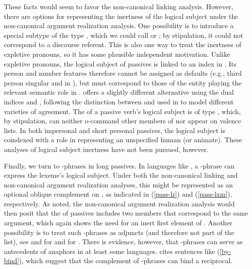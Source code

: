 \documentclass[output=paper,biblatex,babelshorthands,newtxmath,draftmode,colorlinks, citecolor=brown]{langscibook}
\begin{document}
These facts would seem to favor the non-canonical linking analysis.  However, there are options for
representing the inertness of the logical subject under the non-canonical argument realization
analysis.  One possibility is to introduce a special subtype of the type , which we
could call  or ; by stipulation, it could not correspond to a discourse
referent.  This is also one way to treat the inertness of expletive pronouns, so it has some
plausible independent motivation.  Unlike expletive pronouns, the logical subject of passives is
linked to an index in .  Its person and number features therefore cannot be assigned
as defaults (e.g., third person singular  and  in ), but must
correspond to those of the entity playing the relevant semantic role in .
\citet[251--253]{Davis2001} offers a slightly different alternative using the dual indices
 and , following the distinction between  and  used
in \citet[240--250]{Kathol1999b} to model different varieties of agreement.  The  of a
passive verb's logical subject is of type , which, by stipulation, can neither o-command
other members of \argst nor appear on valence lists.
In both impersonal and short personal passives, the logical subject is coindexed with a role in  representing an unspecified human (or animate).
These analyses of logical subject inertness have not been pursued, however.

Finally, we turn to -phrases in long passives.
In languages like , a -phrase can express the lexeme's logical subject.
Under both the non-canonical linking and non-canonical argument realization analyses, this might be represented as an optional oblique complement on \argst, as indicated in (\ref{pass-lr}) and (\ref{pass-lxm}), respectively.
As noted, the non-canonical argument realization analysis would then posit that the \argst of passives includes two members that correspond to the same argument, which again shows the need for an inert first element of \argst.
Another possibility is to treat such -phrases as adjuncts (and therefore not part of the \argst list), see \citet[Chapter 7]{Hoehle78a} and \citet[292--294]{Mueller2003e} for  and \citet[180]{Jackendoff1990} for . 
There is evidence, however, that -phrases can serve as antecedents of anaphors in at least some languages.
\citet[111]{Collins2005} cites sentences like (\ref{by-bind}), which suggest that the complement of -phrases can bind a reciprocal.
\end{document}
